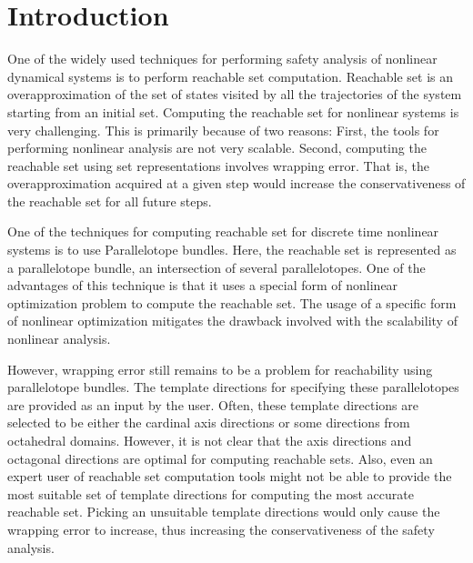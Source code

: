 
\section{Introduction}
\label{sec:intro}

One of the widely used techniques for performing safety analysis of nonlinear dynamical systems is to perform reachable set computation.
%
Reachable set is an overapproximation of the set of states visited by all the trajectories of the system starting from an initial set.
%
Computing the reachable set for nonlinear systems is very challenging.
%
This is primarily because of two reasons:
%
First, the tools for performing nonlinear analysis are not very scalable.
%
Second, computing the reachable set using set representations involves wrapping error.
%
That is, the overapproximation acquired at a given step would increase the conservativeness of the reachable set for all future steps.

One of the techniques for computing reachable set for discrete time nonlinear systems is to use Parallelotope bundles.
%
Here, the reachable set is represented as a parallelotope bundle, an intersection of several parallelotopes.
%
One of the advantages of this technique is that it uses a special form of nonlinear optimization problem to compute the reachable set.
%
The usage of a specific form of nonlinear optimization mitigates the drawback involved with the scalability of nonlinear analysis.

However, wrapping error still remains to be a problem for reachability using parallelotope bundles.
%
The template directions for specifying these parallelotopes are provided as an input by the user.
%
Often, these template directions are selected to be either the cardinal axis directions or some directions from octahedral domains.
%
However, it is not clear that the axis directions and octagonal directions are optimal for computing reachable sets.
%
Also, even an expert user of reachable set computation tools might not be able to provide the most suitable set of template directions for computing the most accurate reachable set.
%
Picking an unsuitable template directions would only cause the wrapping error to increase, thus increasing the conservativeness of the safety analysis.

